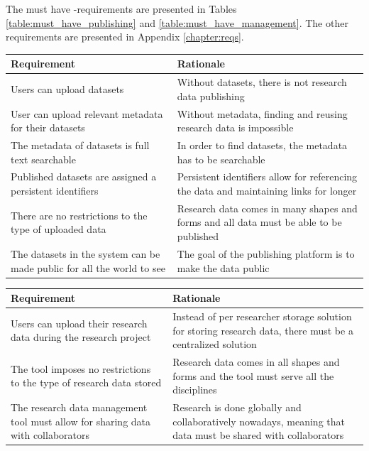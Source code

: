 The must have -requirements are presented in Tables \ref{table:must_have_publishing} and
\ref{table:must_have_management}. The other requirements are presented in Appendix
\ref{chapter:reqs}.

\label{table:must_have_publishing}
    \begin{tabularx}{\textwidth}{| >{\raggedright}p{3cm} | X |}
    \hline
    \textbf{Requirement} & \textbf{Rationale} \\
    \hline
    \rowcolor{Gray}
    Users can upload datasets    & Without datasets, there is not research data publishing\\
    \hline
    User can upload relevant metadata for their datasets & Without metadata, finding and reusing research data is impossible\\
    \hline
    \rowcolor{Gray}
    The metadata of datasets is full text searchable    &  In order to find datasets, the metadata has to be searchable\\
    \hline
    Published datasets are assigned a persistent identifiers    & Persistent identifiers allow for referencing the data and maintaining links for longer\\
    \hline
    \rowcolor{Gray}
    There are no restrictions to the type of uploaded data          & Research data comes in many shapes and forms and all data must be able to be published\\
    \hline
    The datasets in the system can be made public for all the world to see    & The goal of the publishing platform is to make the data public\\
    \hline
\end{tabularx}

\pagebreak

\label{table:must_have_management}
    \begin{tabularx}{\textwidth}{| >{\raggedright}p{3cm} | X |}
    \hline
    \textbf{Requirement} & \textbf{Rationale} \\
    \hline
    \rowcolor{Gray}
    Users can upload their research data during the research project    & Instead of per researcher storage solution for storing research data, there must be a centralized solution\\
    \hline
    The tool imposes no restrictions to the type of research data stored & Research data comes in all shapes and forms and the tool must serve all the disciplines\\
    \hline
    \rowcolor{Gray}
    The research data management tool must allow for sharing data with collaborators    &  Research is done globally and collaboratively nowadays, meaning that data must be shared with collaborators\\
    \hline
\end{tabularx}
